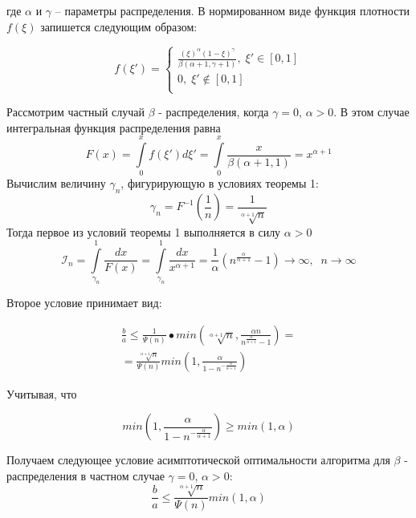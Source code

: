\documentclass[a4paper, 14pt]{extarticle}
\numberwithin{equation}{section}
\begin{document}
где $\alpha$ и $\gamma$ -- параметры распределения. В нормированном виде функция плотности $f(\xi)$ запишется следующим образом:

\begin{equation}
f(\xi') = 
\begin{cases}
   \frac{(\xi)^\alpha (1-\xi)^\gamma}{ \beta(\alpha+1, \gamma+1)}, \;  \xi' \in [0,1]\\
   0, \;  \xi' \notin [0,1] \\
 \end{cases}
\end{equation}

Рассмотрим частный случай $\beta$ - распределения, когда $\gamma=0$, $\alpha>0$. В этом случае интегральная функция распределения равна
\begin{equation}
F(x) = \int\limits_0^x f(\xi')d\xi' = \int\limits_0^x \frac{x}{\beta(\alpha+1,1)} = x^{\alpha+1}
\end{equation} 
Вычислим величину $\gamma_n$, фигурирующую в условиях теоремы 1:
\begin{equation}
\gamma_n = F^{-1}(\frac{1}{n}) = \frac{1}{\sqrt[\alpha+1]{n}}
\end{equation}
Тогда первое из условий теоремы 1 выполняется в силу $\alpha>0$
\begin{equation}
\mathcal{I}_n = \int\limits_{\gamma_n}^1 \frac{dx}{F(x)} = \int\limits_{\gamma_n}^1 \frac{dx}{x^{\alpha+1}} = \frac{1}{\alpha} (n^{\frac{\alpha}{\alpha+1}}-1) \rightarrow \infty, \; \; n\rightarrow \infty
\end{equation}

Второе условие принимает вид:

\begin{equation}
\begin{aligned}
\frac{b}{a} \leqslant \frac{1}{\Psi(n)}•min(\sqrt[\alpha+1]{n}, \frac{\alpha n}{n^{\frac{\alpha}{\alpha+1}}-1}) = \\
=\frac{\sqrt[\alpha+1]{n}}{\Psi(n)} min(1, \frac{\alpha}{1-n^{-\frac{\alpha}{\alpha+1}}})
\end{aligned}
\end{equation}

Учитывая, что

\begin{equation}
min(1, \frac{\alpha}{1-n^{-\frac{\alpha}{\alpha+1}}}) \geqslant min(1, \alpha)
\end{equation}

Получаем следующее условие асимптотической оптимальности алгоритма \text{\algorithm} для $\beta$ - распределения в частном случае $\gamma=0$, $\alpha>0$:
\begin{equation}
\frac{b}{a} \leqslant \frac{\sqrt[\alpha+1]{n}}{\Psi(n)}min(1,\alpha)
\end{equation}
\end{document}
